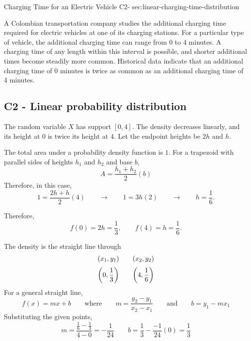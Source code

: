 	
	\sectionScored
	{Charging Time for an Electric Vehicle}
	{C2-}
	{sec:linear-charging-time-distribution}
	{
		A Colombian transportation company studies the additional charging time
		required for electric vehicles at one of its charging stations. For a
		particular type of vehicle, the additional charging time can range
		from 0 to 4 minutes. A charging time of any length within this interval
		is possible, and shorter additional times become steadily more common.
		Historical data indicate that an additional charging time of 0 minutes
		is twice as common as an additional charging time of 4 minutes.
		
		
		\label{subsec:linear-charging-time-probabilities}
		\subsection*{C2 - Linear probability distribution }
		
		The random variable \(X\) has support \([0,4]\). The density decreases
		linearly, and its height at \(0\) is twice its height at \(4\).
		Let the endpoint heights be \(2h\) and \(h\).
		
		
		The total area under a probability density function is \(1\).
		For a trapezoid with parallel sides of heights \(h_1\) and \(h_2\) and base \(b\),
		\[
		A=\frac{h_1+h_2}{2}(b)
		\]
		Therefore, in this case,
		\[
		1=\frac{2h+h}{2}(4)
		\qquad \rightarrow \qquad
		1=3h(2)
		\qquad \rightarrow \qquad
		h=\frac16.
		\]
		
		Therefore,
		\[
		f(0)=2h=\frac13,
		\qquad
		f(4)=h=\frac16.
		\]
		
		
		The density is the straight line through
		\[
		\begin{array}{c@{\qquad}c}
			(x_1,y_1) & (x_2,y_2) \\[2mm]
			\left(0,\dfrac13\right)
			&
			\left(4,\dfrac16\right)
		\end{array}
		\]
		For a general straight line,
		\[
		f(x)=mx+b
		\qquad
		\text{where}
		\qquad
		m=\frac{y_2-y_1}{x_2-x_1}
		\qquad\text{and}\qquad
		b=y_1-mx_1
		\]
		Substituting the given points,
		\[
		m=
		\frac{\frac16-\frac13}{4-0}
		=
		-\frac1{24}
		\qquad
		b=\frac13 - \frac{-1}{24}(0) =\frac13
		\]
		
}
